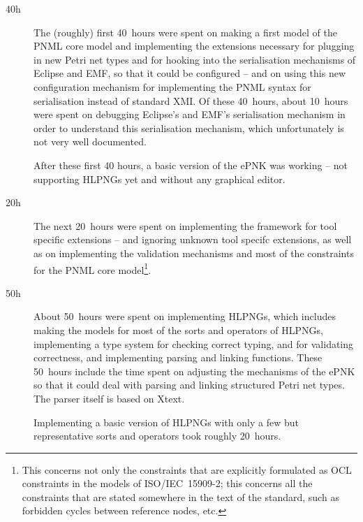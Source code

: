 \begin{description}
\item[40h] The (roughly) first 40~hours were spent on making a first model of
           the PNML core model and implementing the extensions necessary
           for plugging in new Petri net types and for hooking into the
           serialisation mechanisms of Eclipse and EMF, so that it could
           be configured -- and on using this new configuration mechanism for
           implementing the PNML syntax for serialisation instead of standard
           XMI. Of these 40~hours, about 10~hours were spent on debugging
           Eclipse's and EMF's serialisation mechanism in order to
           understand this serialisation mechanism, which unfortunately is
           not very well documented.
           
           After these first 40 hours, a basic version of the ePNK was working
           -- not supporting HLPNGs yet and without any graphical editor.
           
\item[20h] The next 20~hours were spent on implementing the framework
           for tool specific extensions -- and ignoring unknown tool specifc
           extensions, as well as on implementing the validation mechanisms
           and most of the constraints for the PNML core model\footnote
             {This concerns not only the constraints that are
             explicitly formulated as OCL constraints in the
             models of ISO/IEC~15909-2; this concerns all the constraints
             that are stated somewhere in the text of the standard,
             such as forbidden cycles between reference nodes, etc.}.
             
\item[50h] About 50~hours were spent on implementing HLPNGs, which includes
           making the models for most of the sorts and operators
           of HLPNGs, implementing a type system for checking correct
           typing, and for validating correctness, and implementing parsing
           and linking functions. These 50~hours include the time spent
           on adjusting the mechanisms of the ePNK so that it could deal
           with parsing and linking structured Petri net types. The
           parser itself is based on Xtext.
           
           Implementing a basic version of HLPNGs with only a few
           but representative sorts and operators took roughly 20~hours.
 

\end{description}
